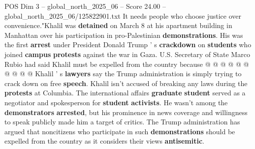 \begin{textsample}{POS Dim 3 – global\_north\_2025\_06 – Score 24.00 – global\_north\_2025\_06/125822901.txt}
It needs people who choose justice over convenience."Khalil was \textbf{detained} on March 8 at his apartment building in Manhattan over his participation in pro-Palestinian \textbf{demonstrations}.
His was the first \textbf{arrest} under President Donald Trump ' s \textbf{crackdown} on \textbf{students} who joined \textbf{campus} \textbf{protests} against the war in Gaza.
U.S.
Secretary of State Marco Rubio had said Khalil must be expelled from the country because @ @ @ @ @ @ @ @ @ @ Khalil ' s \textbf{lawyers} say the Trump administration is simply trying to crack down on free \textbf{speech}.
Khalil isn't accused of breaking any laws during the \textbf{protests} at Columbia.
The international affairs \textbf{graduate} \textbf{student} served as a negotiator and spokesperson for \textbf{student} \textbf{activists}.
He wasn't among the \textbf{demonstrators} \textbf{arrested}, but his prominence in news coverage and willingness to speak publicly made him a target of critics.
The Trump administration has argued that noncitizens who participate in such \textbf{demonstrations} should be expelled from the country as it considers their views \textbf{antisemitic}.

\end{textsample}
